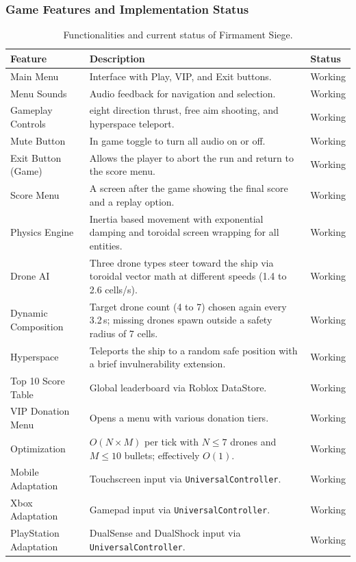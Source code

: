 \documentclass[12pt,letterpaper]{article}
\begin{document}
\subsubsection{Game Features and Implementation Status}

\begin{table}[H]
\centering
\begin{tabular}{|p{4cm}|p{8cm}|p{2.5cm}|}
\hline
\textbf{Feature} & \textbf{Description} & \textbf{Status} \\
\hline
Main Menu & Interface with Play, VIP, and Exit buttons. & Working \\
\hline
Menu Sounds & Audio feedback for navigation and selection. & Working \\
\hline
Gameplay Controls & eight direction thrust, free aim shooting, and hyperspace teleport. & Working \\
\hline
Mute Button & In game toggle to turn all audio on or off. & Working \\
\hline
Exit Button (Game) & Allows the player to abort the run and return to the score menu. & Working \\
\hline
Score Menu & A screen after the game showing the final score and a replay option. & Working \\
\hline
Physics Engine & Inertia based movement with exponential damping and toroidal screen wrapping for all entities. & Working \\
\hline
Drone AI & Three drone types steer toward the ship via toroidal vector math at different speeds (1.4 to 2.6 cells/s). & Working \\
\hline
Dynamic Composition & Target drone count (4 to 7) chosen again every 3.2\,s; missing drones spawn outside a safety radius of 7 cells. & Working \\
\hline
Hyperspace & Teleports the ship to a random safe position with a brief invulnerability extension. & Working \\
\hline
Top 10 Score Table & Global leaderboard via Roblox DataStore. & Working \\
\hline
VIP Donation Menu & Opens a menu with various donation tiers. & Working \\
\hline
Optimization & $O(N \times M)$ per tick with $N \leq 7$ drones and $M \leq 10$ bullets; effectively $O(1)$. & Working \\
\hline
Mobile Adaptation & Touchscreen input via \texttt{UniversalController}. & Working \\
\hline
Xbox Adaptation & Gamepad input via \texttt{UniversalController}. & Working \\
\hline
PlayStation Adaptation & DualSense and DualShock input via \texttt{UniversalController}. & Working \\
\hline
\end{tabular}
\caption{Functionalities and current status of Firmament Siege.}
\end{table}
\end{document}
